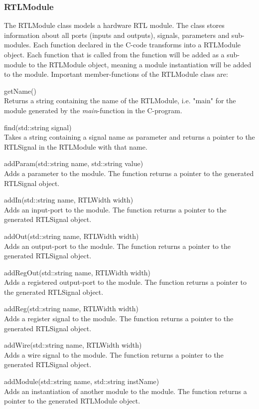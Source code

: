 \subsubsection{RTLModule}
The RTLModule class models a hardware RTL module. The class stores information about all ports (inputs and outputs), signals, parameters and sub-modules. Each function declared in the C-code transforms into a RTLModule object. Each function that is called from the function will be added as a sub-module to the RTLModule object, meaning a module instantiation will be added to the module. Important member-functions of the RTLModule class are:
\begin{compactdesc}
    \item[getName()] \hfill \\
    Returns a string containing the name of the RTLModule, i.e. "main" for the module generated by the \textit{main}-function in the C-program.
    \item[find(std::string signal)] \hfill \\
    Takes a string containing a signal name as parameter and returns a pointer to the RTLSignal in the RTLModule with that name.
    \item[addParam(std::string name, std::string value)] \hfill \\
    Adds a parameter to the module. The function returns a pointer to the generated RTLSignal object.
    \item[addIn(std::string name, RTLWidth width)] \hfill \\
    Adds an input-port to the module. The function returns a pointer to the generated RTLSignal object.
    \item[addOut(std::string name, RTLWidth width)] \hfill \\
    Adds an output-port to the module. The function returns a pointer to the generated RTLSignal object.
    \item[addRegOut(std::string name, RTLWidth width)] \hfill \\
    Adds a registered output-port to the module. The function returns a pointer to the generated RTLSignal object.
    \item[addReg(std::string name, RTLWidth width)] \hfill \\
    Adds a register signal to the module. The function returns a pointer to the generated RTLSignal object.
    \item[addWire(std::string name, RTLWidth width)] \hfill \\
    Adds a wire signal to the module. The function returns a pointer to the generated RTLSignal object.
    \item[addModule(std::string name, std::string instName)] \hfill \\
    Adds an instantiation of another module to the module. The function returns a pointer to the generated RTLModule
    object.
\end{compactdesc}
